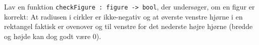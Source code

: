 Lav en funktion \lstinline{checkFigure : figure -> bool},
  der undersøger, om en figur er korrekt: At radiusen i cirkler
  er ikke-negativ og at øverste venstre hjørne i en rektangel faktisk
  er ovenover og til venstre for det nederste højre hjørne (bredde og
  højde kan dog godt være 0).
